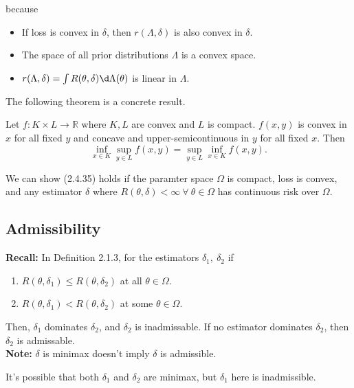 \documentclass[a4paper]{article}
\begin{document}
\begin{remark}
\begin{equation}
	\end{equation}
	because
	\begin{itemize}
		\item If loss is convex in $\delta$, then $r(\Lambda,\delta)$ is also convex in $\delta$.
		\item The space of all prior distributions $\Lambda$ is a convex space.
		\item $r(\Lambda,\delta) = \int R(\theta,\delta) \d \Lambda (\theta)$ is linear in $\Lambda$.
	\end{itemize}
	The following theorem is a concrete result.
	\begin{thm}
		Let $f: K \times L \to \mathbb{R}$ where $K,L$ are convex and $L$ is compact. $f(x,y)$ is convex in $x$ for all fixed $y$ and concave and upper-semicontinuous in $y$ for all fixed $x$. Then
		\begin{equation}
			\inf\limits_{x \in K} \sup\limits_{y \in L} f(x,y) = \sup\limits_{y \in L} \inf\limits_{x \in K}  f(x,y).
		\end{equation}
	\end{thm}
	We can show (2.4.35) holds if the paramter space $\Omega$ is compact, loss is convex, and any estimator $\delta$ where $R(\theta,\delta) < \infty \ \forall \ \theta \in \Omega$ has continuous risk over $\Omega$.
\end{remark}

\subsection{Admissibility}
\textbf{Recall:} In Definition 2.1.3, for the estimators $\delta_1, \ \delta_2$ if  
	\begin{enumerate}
		\item $R(\theta,\delta_1) \leq R(\theta,\delta_2)$ at all $\theta \in \Omega$.
		\item $R(\theta,\delta_1) < R(\theta,\delta_2)$ at some $\theta \in \Omega$.
	\end{enumerate}
Then, $\delta_1$ dominates $\delta_2$, and $\delta_2$ is inadmissable.
If no estimator dominates $\delta_2$, then $\delta_2$ is admissable.\\

\noindent \textbf{Note:} $\delta$ is minimax doesn't imply $\delta$ is admissible.

\begin{center}
\end{center}
It's possible that both $\delta_1$ and $\delta_2$ are minimax, but $\delta_1$ here is inadmissible.
\end{document}
